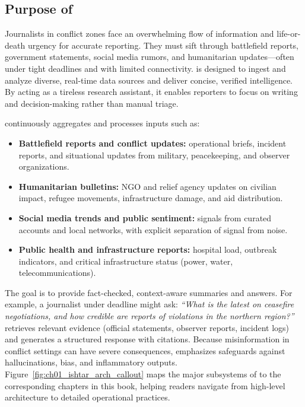 \subsection{Purpose of \ishtar{}}
Journalists in conflict zones face an overwhelming flow of information and life-or-death urgency for accurate reporting. They must sift through battlefield reports, government statements, social media rumors, and humanitarian updates---often under tight deadlines and with limited connectivity. \ishtar{} is designed to ingest and analyze diverse, real-time data sources and deliver concise, verified intelligence. By acting as a tireless research assistant, it enables reporters to focus on writing and decision-making rather than manual triage.

\ishtar{} continuously aggregates and processes inputs such as:
\begin{itemize}
  \item \textbf{Battlefield reports and conflict updates:} operational briefs, incident reports, and situational updates from military, peacekeeping, and observer organizations.
  \item \textbf{Humanitarian bulletins:} NGO and relief agency updates on civilian impact, refugee movements, infrastructure damage, and aid distribution.
  \item \textbf{Social media trends and public sentiment:} signals from curated accounts and local networks, with explicit separation of signal from noise.
  \item \textbf{Public health and infrastructure reports:} hospital load, outbreak indicators, and critical infrastructure status (power, water, telecommunications).
\end{itemize}

The goal is to provide fact-checked, context-aware summaries and answers. For example, a journalist under deadline might ask: \emph{``What is the latest on ceasefire negotiations, and how credible are reports of violations in the northern region?''} \ishtar{} retrieves relevant evidence (official statements, observer reports, incident logs) and generates a structured response with citations. Because misinformation in conflict settings can have severe consequences, \ishtar{} emphasizes safeguards against hallucinations, bias, and inflammatory outputs. Figure~\ref{fig:ch01_ishtar_arch_callout} maps the major subsystems of \ishtar{} to the corresponding chapters in this book, helping readers navigate from high-level architecture to detailed operational practices.

